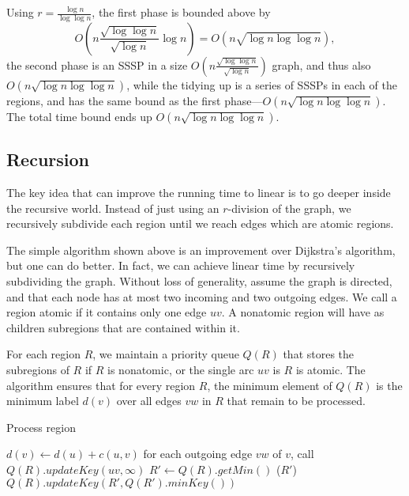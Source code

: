 \documentclass[12pt]{article}
\begin{document}
Using $r=\frac{\log n}{\log \log n}$, the first phase is bounded above by
\[
  O\left(n\frac{\sqrt{\log \log n}}{\sqrt{\log n}} \log n\right)= O(n \sqrt{\log n \log \log n}),
\]
the second phase is an SSSP in a size $O(n \frac{\sqrt{\log \log n}}{\sqrt{\log n}})$ graph, and thus also $O(n \sqrt{\log n \log \log n})$, while the tidying up is a series of SSSPs in each of the regions, and has the same bound as the first phase---$O(n \sqrt{\log n \log \log n})$. The total time bound ends up $O(n \sqrt{\log n \log \log n})$.

\subsection{Recursion}
\label{sec:recursion}

The key idea that can improve the running time to linear is to go deeper inside the recursive world. Instead of just using an $r$-division of the graph, we recursively subdivide each region until we reach edges which are atomic regions.

The simple algorithm shown above is an improvement over Dijkstra's algorithm, but one can do better. In fact, we can achieve linear time by recursively subdividing the graph. Without loss of generality, assume the graph is directed, and that each node has at most two incoming and two outgoing edges. We call a region atomic if it contains only one edge $uv$. A nonatomic region will have as children subregions that are contained within it.

For each region $R$, we maintain a priority queue $Q(R)$ that stores the subregions of $R$ if $R$ is nonatomic, or the single arc $uv$ is $R$ is atomic. The algorithm ensures that for every region $R$, the minimum element of $Q(R)$ is the minimum label $d(v)$ over all edges $vw$ in $R$ that remain to be processed.

\begin{algorithm}
  \caption{Process region}
  \label{alg:process}
  \begin{algorithmic}[1]
          \State $d(v) \gets d(u) + c(u,v)$
          \State for each outgoing edge $vw$ of $v$, call 
        \EndIf
        \State $Q(R).updateKey(uv,\infty)$
      \Else
        \Repeat
          \State $R' \gets Q(R).getMin()$
          \State {}($R'$)
          \State $Q(R).updateKey(R',Q(R').minKey())$
      \EndIf
    \EndProcedure
  \end{algorithmic}
\end{algorithm}
\end{document}
